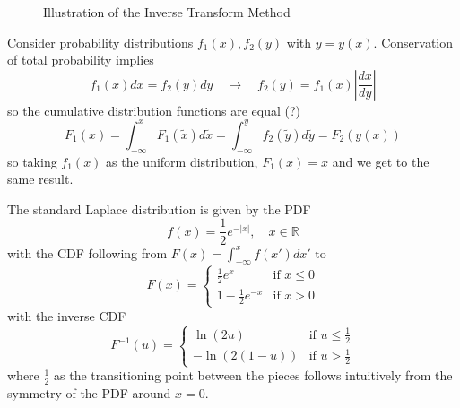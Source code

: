 \begin{figure}[!htb]
 \centering
 \hfill
 \caption{Illustration of the Inverse Transform Method}
 \label{fig:gaussian_inverse}
\end{figure}


Consider probability distributions $f_1(x), f_2(y)$ with $y = y(x)$. Conservation of total probability implies
\begin{equation}
    f_1(x) dx = f_2(y) dy \quad \rightarrow \quad f_2(y) = f_1(x) \left| \frac{dx}{dy} \right|
\end{equation}
so the cumulative distribution functions are equal (?)
\begin{equation}
    F_1(x)=\int_{-\infty}^x F_1(\tilde{x}) d \tilde{x}=\int_{-\infty}^y f_2(\tilde{y}) d \tilde{y}=F_2(y(x))
\end{equation}
so taking $f_1(x)$ as the uniform distribution, $F_1(x) = x$ and we get to the same result.


The standard Laplace distribution is given by the PDF
\begin{equation}
    f(x) = \frac{1}{2} e^{-|x|}, \quad x \in \mathbb{R}
\end{equation}
with the CDF following from $F(x) = \int_{-\infty}^x f(x') dx'$ to
\begin{equation}
    F(x) = \begin{cases}
        \frac{1}{2} e^x & \text{if } x \leq 0 \\
        1 - \frac{1}{2} e^{-x} & \text{if } x > 0
    \end{cases}
\end{equation}
with the inverse CDF
\begin{equation}
    F^{-1}(u) = \begin{cases}
        \ln(2u) & \text{if } u \leq \frac{1}{2} \\
        -\ln(2(1-u)) & \text{if } u > \frac{1}{2}
    \end{cases}
\end{equation}
where $\frac{1}{2}$ as the transitioning point between the pieces follows intuitively from the symmetry of the PDF around $x=0$.

